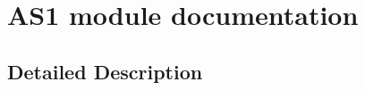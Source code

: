 \hypertarget{group___a_s1__module}{}\section{A\+S1 module documentation}
\label{group___a_s1__module}


\subsection{Detailed Description}
